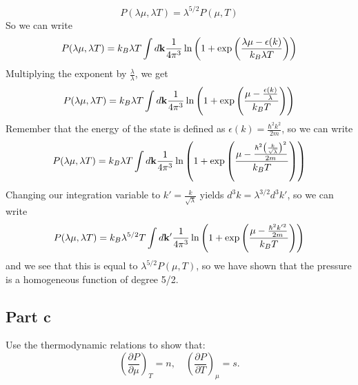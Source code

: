\documentclass[12pt]{article}
\begin{document}
\begin{equation}
    P(\lambda \mu, \lambda T) = \lambda^{5/2} P(\mu, T)
\end{equation}
So we can write
\begin{equation}
    P(\lambda \mu, \lambda T) = k_B \lambda T \int d \vb{k} \frac{1}{4\pi^3} \ln \left( 1 + \exp \left( \frac{\lambda \mu - \epsilon(k)}{k_B \lambda T} \right) \right)
\end{equation}
Multiplying the exponent by $\frac{\lambda}{\lambda}$, we get
\begin{equation}
    P(\lambda \mu, \lambda T) = k_B \lambda T \int d \vb{k} \frac{1}{4\pi^3} \ln \left( 1 + \exp \left( \frac{\mu - \frac{\epsilon(k)}{\lambda}}{k_B T} \right) \right)
\end{equation}
Remember that the energy of the state is defined as $\epsilon(k) = \frac{\hbar^2 k^2}{2m}$, so we can write
\begin{equation}
    P(\lambda \mu, \lambda T) = k_B \lambda T \int d \vb{k} \frac{1}{4\pi^3} \ln \left( 1 + \exp \left( \frac{\mu - \frac{\hbar^2 \left(\frac{k}{\sqrt{\lambda}}\right)^2}{2m}}{k_B T} \right) \right)
\end{equation}
Changing our integration variable to $k' = \frac{k}{\sqrt{\lambda}}$ yields $d^3k = \lambda^{3/2} d^3k'$, so we can write
\begin{equation}
    P(\lambda \mu, \lambda T) = k_B \lambda^{5/2} T \int d \vb{k'} \frac{1}{4\pi^3} \ln \left( 1 + \exp \left( \frac{\mu - \frac{\hbar^2 k'^2}{2m}}{k_B T} \right) \right)
\end{equation}
and we see that this is equal to $\lambda^{5/2} P(\mu, T)$, so we have shown that the pressure is a homogeneous function of degree 5/2.
\subsection{Part c}
Use the thermodynamic relations to show that:
\[
\left( \frac{\partial P}{\partial \mu} \right)_T = n, \quad \left( \frac{\partial P}{\partial T} \right)_\mu = s.
\]
\end{document}
